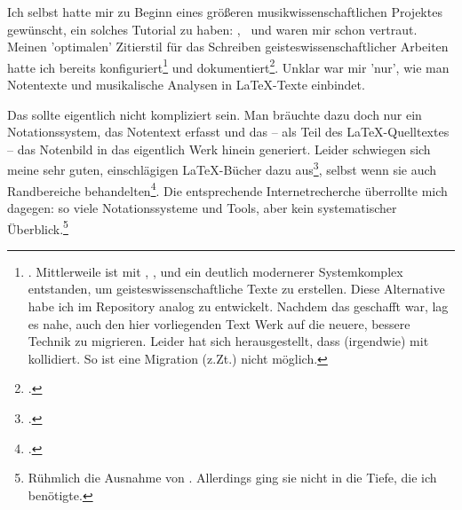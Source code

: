 

%
%

Ich selbst hatte mir zu Beginn eines größeren musikwissenschaftlichen Projektes gewünscht, ein solches Tutorial zu haben: \acc{\LaTeX}, \ und  waren mir schon vertraut. Meinen 'optimalen' Zitierstil für das Schreiben geisteswissenschaftlicher Arbeiten hatte ich bereits konfiguriert\footnote{\cite[vgl.][\nopage wp]{Reincke2018a}. Mittlerweile ist mit \acc{\LaTeX}, ,  und  ein deutlich modernerer Systemkomplex entstanden, um geisteswissenschaftliche Texte zu erstellen. Diese Alternative habe ich im Repository  analog zu  entwickelt. Nachdem das geschafft war, lag es nahe, auch den hier vorliegenden Text  Werk auf die neuere, bessere Technik zu migrieren. Leider hat sich herausgestellt, dass  (irgendwie) mit  kollidiert. So ist eine Migration (z.Zt.) nicht möglich.} und dokumentiert\footnote{\cite[vgl][2ff]{Reincke2018b}.}. Unklar war mir 'nur', wie man Notentexte und musikalische Analysen in \LaTeX-Texte einbindet.

Das sollte eigentlich nicht kompliziert sein. Man bräuchte dazu doch nur ein No\-ta\-tions\-system, das Notentext erfasst und das -- als Teil des \LaTeX-Quelltextes -- das Notenbild in das eigentlich Werk hinein generiert. Leider schwiegen sich meine sehr guten, einschlägigen \LaTeX-Bücher dazu aus\footcite[vgl.][vi ff, insbesondere 905 u. 909: das umfangreiche Register erwähnt weder Musik im allgemeinen noch LilyPond oder MusiX\TeX\ im Besonderen]{Voss2012a}, selbst wenn sie auch Randbereiche behandelten\footcite[vgl.][vii ff, insbesondere 1080 u. 1087: auch dieses umfangreiche Register erwähnt weder Musik im allgemeinen noch LilyPond oder MusiX\TeX\ im Besonderen.]{MitGoo2005a}. Die entsprechende Internetrecherche überrollte mich dagegen: so viele Notationssysteme und Tools, aber kein systematischer Überblick.\footnote{Rühmlich die Ausnahme von \cite[][\nopage wp.]{Thoma2018a}. Allerdings ging sie nicht in die Tiefe, die ich benötigte.}

